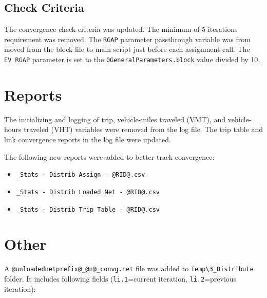 \documentclass[
  letterpaper,
  DIV=11,
  numbers=noendperiod]{scrreprt}
\providecommand{\tightlist}{%
  \setlength{\itemsep}{0pt}\setlength{\parskip}{0pt}}\usepackage{longtable,booktabs,array}
\begin{document}
\hypertarget{check-criteria}{%
\subsection{Check Criteria}\label{check-criteria}}

The convergence check criteria was updated. The minimum of 5 iterations
requirement was removed. The \texttt{RGAP} parameter passthrough
variable was from moved from the block file to main script just before
each assignment call. The \texttt{EV\ RGAP} parameter is set to the
\texttt{0GeneralParameters.block} value divided by 10.

\hypertarget{reports}{%
\section{Reports}\label{reports}}

The initializing and logging of trip, vehicle-miles traveled (VMT), and
vehicle-hours traveled (VHT) variables were removed from the log file.
The trip table and link convergence reports in the log file were
updated.

The following new reports were added to better track convergence:

\begin{itemize}
\tightlist
\item
  \texttt{\_Stats\ -\ Distrib\ Assign\ -\ @RID@.csv}
\item
  \texttt{\_Stats\ -\ Distrib\ Loaded\ Net\ -\ @RID@.csv}
\item
  \texttt{\_Stats\ -\ Distrib\ Trip\ Table\ -\ @RID@.csv}
\end{itemize}

\hypertarget{other}{%
\section{Other}\label{other}}

A \texttt{@unloadednetprefix@\_@n@\_convg.net} file was added to
\texttt{Temp\textbackslash{}3\_Distribute} folder. It includes following
fields (\texttt{li.1}=current iteration, \texttt{li.2}=previous
iteration):
\end{document}
